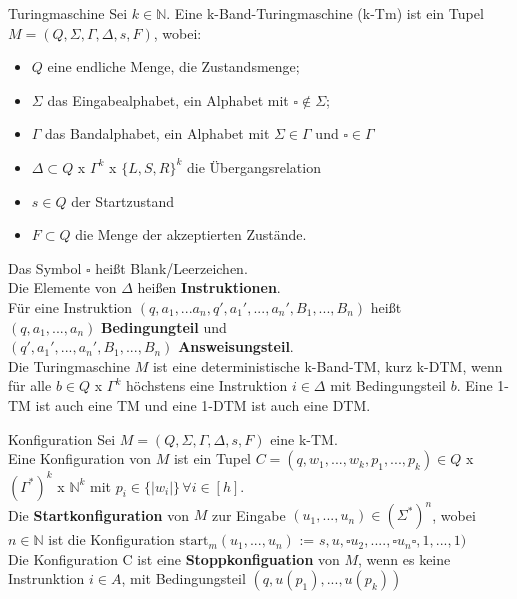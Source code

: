 \begin{defn}{Turingmaschine} 
    Sei $k \in \mathbb{N}$. Eine k-Band-Turingmaschine (k-Tm) ist ein Tupel $M = (Q, \Sigma, \Gamma, \Delta,s,F)$, wobei:
    \begin{itemize}
        \item $Q$ eine endliche Menge, die Zustandsmenge;
        \item $\Sigma$ das Eingabealphabet, ein Alphabet mit $\square \notin \Sigma$;
        \item $\Gamma$ das Bandalphabet, ein Alphabet mit $\Sigma \in \Gamma$ und $\square \in \Gamma$
        \item $\Delta \subset Q$ x $\Gamma^k$ x $\{L,S,R\}^k$ die Übergangsrelation
        \item $s \in Q$ der Startzustand
        \item $F \subset Q$ die Menge der akzeptierten Zustände.
    \end{itemize}

    \vspace{1em}

    Das Symbol $\square$ heißt Blank/Leerzeichen. \\

    Die Elemente von $\Delta$ heißen \textbf{Instruktionen}. \\
    Für eine Instruktion $(q,a_1,...a_n,q',a_1',...,a_n',B_1,...,B_n)$ heißt \\
    $(q,a_1,...,a_n)$ \textbf{Bedingungteil} und \\
    $(q',a_1',...,a_n',B_1,...,B_n)$ \textbf{Answeisungsteil}. \\

    Die Turingmaschine $M$ ist eine deterministische k-Band-TM, kurz k-DTM, wenn für alle $b \in Q$ x $\Gamma^k$ höchstens eine Instruktion $i \in \Delta$ mit Bedingungsteil $b$.
    Eine 1-TM ist auch eine TM und eine 1-DTM ist auch eine DTM.
\end{defn}

\begin{defn}{Konfiguration}
    Sei $M = (Q, \Sigma, \Gamma, \Delta, s, F)$ eine k-TM. \\

    Eine Konfiguration von $M$ ist ein Tupel $C = (q,w_1,...,w_k,p_1,...,p_k) \in Q$ x $(\Gamma^*)^k$ x $\mathbb{N}^k$ mit $p_i \in \{| w_i |\} \, \forall i \in [h]$. \\

    Die \textbf{Startkonfiguration} von $M$ zur Eingabe $(u_1,...,u_n)\in(\Sigma^*)^n$, wobei $n\in\mathbb{N}$ ist die Konfiguration $\text{start}_m(u_1,...,u_n)$ := $s, u,\square u_2,....,\square u_n \square, 1,...,1)$ \\

    Die Konfiguration C ist eine \textbf{Stoppkonfiguation} von $M$, wenn es keine Instrunktion $i \in A$, mit Bedingungsteil $(q, u(p_1),...,u(p_k))$
\end{defn}

